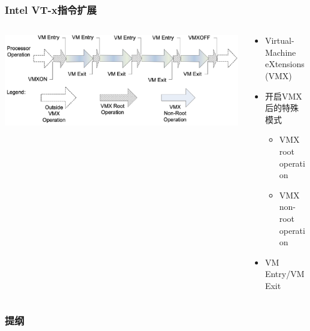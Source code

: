 \begin{frame}
    \frametitle{Intel VT-x指令扩展}
    \begin{columns}
        
        \begin{column}{.6\textwidth}
            
            \includegraphics[width=1.\textwidth]{figs/Intel-VT-x.png}
            
        \end{column}
        
        \begin{column}{.4\textwidth}
            \begin{itemize}
                \item Virtual-Machine eXtensions (VMX)
                \item 开启VMX后的特殊模式
                \begin{itemize}
                    \item VMX root operation
                    \item VMX non-root operation
                \end{itemize} 
                \item VM Entry/VM Exit
            \end{itemize} 
        \end{column}
    \end{columns}
\end{frame}
\begin{frame}
\frametitle{提纲} %
\tableofcontents %
\end{frame}
